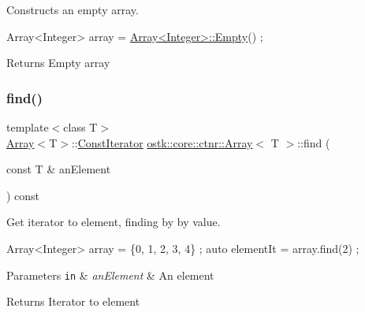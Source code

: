 Constructs an empty array. 


\begin{DoxyCode}
Array<Integer> array = \hyperlink{classostk_1_1core_1_1ctnr_1_1_array_a0d6dc521540ee128b43a66663c9f3dd8}{Array<Integer>::Empty}() ;
\end{DoxyCode}


\begin{DoxyReturn}{Returns}
Empty array 
\end{DoxyReturn}
\mbox{\label{classostk_1_1core_1_1ctnr_1_1_array_abf965f4f2eaa744eeeafd315837ec9fb}} 
\subsubsection{\texorpdfstring{find()}{find()}\hspace{0.1cm}{\footnotesize\ttfamily [1/2]}}
{\footnotesize\ttfamily template$<$class T$>$ \\
\hyperlink{classostk_1_1core_1_1ctnr_1_1_array}{Array}$<$T$>$\+::\hyperlink{classostk_1_1core_1_1ctnr_1_1_array_acf6e5ab86e3ad3e125f61b1933772a14}{Const\+Iterator} \hyperlink{classostk_1_1core_1_1ctnr_1_1_array}{ostk\+::core\+::ctnr\+::\+Array}$<$ T $>$\+::find (\begin{DoxyParamCaption}\item[{const T \&}]{an\+Element }\end{DoxyParamCaption}) const}



Get iterator to element, finding by by value. 


\begin{DoxyCode}
Array<Integer> array = \{0, 1, 2, 3, 4\} ;
\textcolor{keyword}{auto} elementIt = array.find(2) ;
\end{DoxyCode}



\begin{DoxyParams}[1]{Parameters}
\mbox{\tt in}  & {\em an\+Element} & An element \\
\hline
\end{DoxyParams}
\begin{DoxyReturn}{Returns}
Iterator to element 
\end{DoxyReturn}
\mbox{\label{classostk_1_1core_1_1ctnr_1_1_array_abff2b3ec6c0a3345568ddd7c19ff5b86}} 
